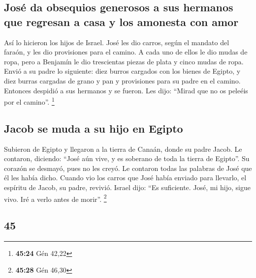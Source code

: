\begin{paracol}{2}
\hypertarget{josuxe9-da-obsequios-generosos-a-sus-hermanos-que-regresan-a-casa-y-los-amonesta-con-amor}{%
\subsection{José da obsequios generosos a sus hermanos que regresan a
casa y los amonesta con
amor}\label{josuxe9-da-obsequios-generosos-a-sus-hermanos-que-regresan-a-casa-y-los-amonesta-con-amor}}

 Así lo hicieron los hijos de Israel. José les dio
carros, según el mandato del faraón, y les dio provisiones para el
camino.  A cada uno de ellos le dio mudas de ropa, pero a
Benjamín le dio trescientas piezas de plata y cinco mudas de ropa.
 Envió a su padre lo siguiente: diez burros cargados con
los bienes de Egipto, y diez burras cargadas de grano y pan y
provisiones para su padre en el camino.  Entonces
despidió a sus hermanos y se fueron. Les dijo: ``Mirad que no os peleéis
por el camino''. \footnote{\textbf{45:24} Gén 42,22}

\hypertarget{jacob-se-muda-a-su-hijo-en-egipto}{%
\subsection{Jacob se muda a su hijo en
Egipto}\label{jacob-se-muda-a-su-hijo-en-egipto}}

 Subieron de Egipto y llegaron a la tierra de Canaán,
donde su padre Jacob.  Le contaron, diciendo: ``José aún
vive, y es soberano de toda la tierra de Egipto''. Su corazón se
desmayó, pues no les creyó.  Le contaron todas las
palabras de José que él les había dicho. Cuando vio los carros que José
había enviado para llevarlo, el espíritu de Jacob, su padre, revivió.
 Israel dijo: ``Es suficiente. José, mi hijo, sigue vivo.
Iré a verlo antes de morir''. \footnote{\textbf{45:28} Gén 46,30}

\switchcolumn
\begin{otherlanguage}{english}

\hypertarget{section-89}{%
\section{45}\label{section-89}}


\end{otherlanguage}
\end{paracol}
